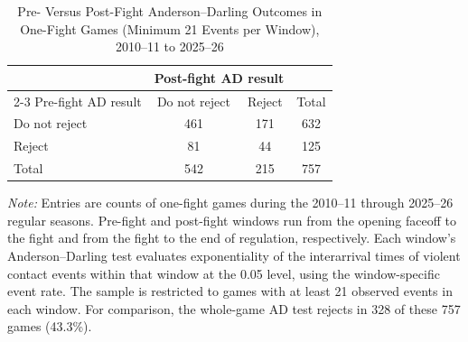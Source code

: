 \begin{table}[htbp]
\centering
\caption{Pre- Versus Post-Fight Anderson--Darling Outcomes in One-Fight Games (Minimum 21 Events per Window), 2010--11 to 2025--26}
\label{tab:one_fight_AD_rejection_min_21_20102011_20252026}
\small
\renewcommand{\arraystretch}{1.15}
\setlength{\tabcolsep}{6pt}

\begin{tabular*}{0.78\textwidth}{@{\extracolsep{\fill}}lccc}
\toprule
 & \multicolumn{2}{c}{Post-fight AD result} & \\
\cmidrule(lr){2-3}
Pre-fight AD result & Do not reject & Reject & Total \\
\midrule
Do not reject & 461 & 171 & 632 \\
Reject & 81 & 44 & 125 \\
\midrule
Total & 542 & 215 & 757 \\
\bottomrule
\end{tabular*}

\vspace{0.4em}
\parbox{0.78\textwidth}{
\footnotesize
\textit{Note:} Entries are counts of one-fight games during the 2010--11 through 2025--26 regular seasons. Pre-fight and post-fight windows run from the opening faceoff to the fight and from the fight to the end of regulation, respectively. Each window's Anderson--Darling test evaluates exponentiality of the interarrival times of violent contact events within that window at the 0.05 level, using the window-specific event rate. The sample is restricted to games with at least 21 observed events in each window. For comparison, the whole-game AD test rejects in 328 of these 757 games (43.3\%).
}
\end{table}
